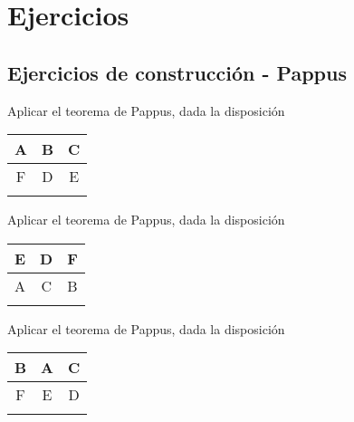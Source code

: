 \section{Ejercicios}

\subsection{Ejercicios de construcción - Pappus}

\begin{section-exercise}
    Aplicar el teorema de Pappus, dada la disposición \hspace{0.3cm}
    \begin{tabular}{|c|c|c|}
        \hline
        A&B&C \\\hline
        F&D&E \\\hline\hline
        && \\\hline
    \end{tabular}
    \vspace*{\fill}
    \begin{figure}[H]
        \centering
        
    \end{figure}
    \vspace*{\fill}
\end{section-exercise}

\newpage
\begin{section-exercise}
    Aplicar el teorema de Pappus, dada la disposición \hspace{0.3cm}
    \begin{tabular}{|c|c|c|}
        \hline
        E&D&F \\\hline
        A&C&B \\\hline\hline
        && \\\hline
    \end{tabular}
    \vspace*{\fill}
    \begin{figure}[H]
        \centering
        
    \end{figure}
    \vspace*{\fill}
\end{section-exercise}

\newpage
\begin{section-exercise}
    Aplicar el teorema de Pappus, dada la disposición \hspace{0.3cm}
    \begin{tabular}{|c|c|c|}
        \hline
        B&A&C \\\hline
        F&E&D \\\hline\hline
        && \\\hline
    \end{tabular}
    \vspace*{\fill}
    \begin{figure}[H]
        \centering
        
    \end{figure}
    \vspace*{\fill}
\end{section-exercise}

